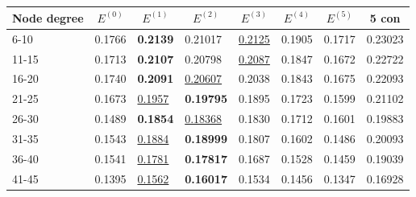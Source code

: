 \begin{table*}[]
    \centering
    \begin{tabular}{|l|l|l|l|l|l|l||l|}
        \hline
        Node degree & \multicolumn{1}{c|}{$E^{(0)}$} & \multicolumn{1}{c|}{$E^{(1)}$} & \multicolumn{1}{c|}{$E^{(2)}$} & \multicolumn{1}{c|}{$E^{(3)}$} & \multicolumn{1}{c|}{$E^{(4)}$} & \multicolumn{1}{c||}{$E^{(5)}$} & \multicolumn{1}{c|}{5 con} \\ \hline
        6-10        & 0.1766                         & \textbf{0.2139}                & 0.21017                        & \underline{0.2125}             & 0.1905                         & 0.1717                          & 0.23023                    \\ \hline
        11-15       & 0.1713                         & \textbf{0.2107}                & 0.20798                        & \underline{0.2087}             & 0.1847                         & 0.1672                          & 0.22722                    \\ \hline
        16-20       & 0.1740                         & \textbf{0.2091}                & \underline{0.20607}            & 0.2038                         & 0.1843                         & 0.1675                          & 0.22093                    \\ \hline
        21-25       & 0.1673                         & \underline{0.1957}             & \textbf{0.19795}               & 0.1895                         & 0.1723                         & 0.1599                          & 0.21102                    \\ \hline
        26-30       & 0.1489                         & \textbf{0.1854}                & \underline{0.18368}            & 0.1830                         & 0.1712                         & 0.1601                          & 0.19883                    \\ \hline
        31-35       & 0.1543                         & \underline{0.1884}             & \textbf{0.18999}               & 0.1807                         & 0.1602                         & 0.1486                          & 0.20093                    \\ \hline
        36-40       & 0.1541                         & \underline{0.1781}             & \textbf{0.17817}               & 0.1687                         & 0.1528                         & 0.1459                          & 0.19039                    \\ \hline
        41-45       & 0.1395                         & \underline{0.1562}             & \textbf{0.16017}               & 0.1534                         & 0.1456                         & 0.1347                          & 0.16928                    \\ \hline

\end{tabular}
\end{table*}
